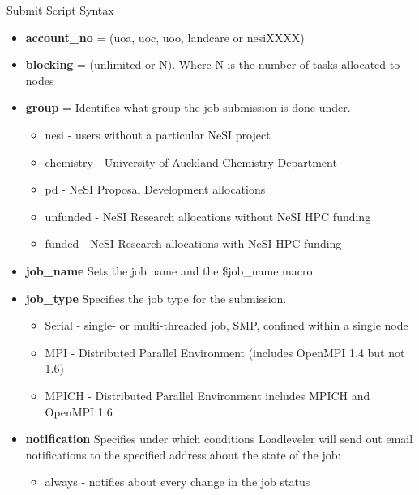 \documentclass[final,t]{beamer}
\begin{document}
\begin{frame}[fragile]{}
\begin{columns}[t]
\begin{column}{.3\linewidth}
 
      \begin{block}{Submit Script Syntax}
        \begin{itemize}
        \item \textbf{account\_no} = (uoa, uoc, uoo, landcare or nesiXXXX)
        \item \textbf{blocking} = (unlimited or N). Where N is the number of tasks allocated to nodes
        \item \textbf{group} = Identifies what group the job submission is done under.
        \begin{itemize}
            \item nesi - users without a particular NeSI project
            \item chemistry - University of Auckland Chemistry Department
            \item pd - NeSI Proposal Development allocations
            \item unfunded - NeSI Research allocations without NeSI HPC funding
            \item funded - NeSI Research allocations with NeSI HPC funding
        \end{itemize}
        \item \textbf{job\_name} Sets the job name and the \$job\_name macro
        \item \textbf{job\_type} Specifies the job type for the submission. 
        \begin{itemize}
            \item Serial - single- or multi-threaded job, SMP, confined within a single node
            \item MPI - Distributed Parallel Environment (includes OpenMPI 1.4 but not 1.6)
            \item MPICH - Distributed Parallel Environment includes MPICH and OpenMPI 1.6
        \end{itemize}        
        \item \textbf{notification} Specifies under which conditions Loadleveler will send out email notifications to the specified address about the state of the job:
        \begin{itemize}
            \item always - notifies about every change in the job status

\end{itemize}
\end{itemize}
\end{block}
\end{column}
\end{columns}
\end{frame}
\end{document}
